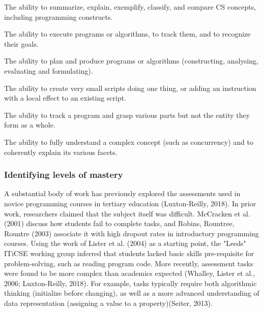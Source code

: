 \begin{description}[leftmargin=1em]
\item[Understanding:] The ability to summarize, explain, exemplify,
    classify, and compare CS concepts, including programming constructs.
\item[Applying:] The ability to execute programs or algorithms, to track
    them, and to recognize their goals.
\item[Creating:] The ability to plan and produce programs or algorithms
    (constructing, analysing, evaluating and formulating).
\item[Unistructural:] The ability to create very small scripts doing one
    thing, or adding an instruction with a local effect to an existing
    script.
\item[Multistructural:] The ability to track a program and grasp various
    parts but not the entity they form as a whole.
\item[Relational:] The ability to fully understand a complex concept (such
    as concurrency) and to coherently explain its various facets.
\end{description}






\subsubsection*{Identifying levels of mastery}
A substantial body of work has previously explored the assessments used in novice programming courses in tertiary education (Luxton-Reilly, 2018). In prior work, researchers claimed that the subject itself was difficult. McCracken et al. (2001) discuss how students fail to complete tasks, and Robins, Rountree, Rountre (2003) associate it with high dropout rates in introductory programming courses. Using the work of Lister et al. (2004) as a starting point, the "Leeds" ITiCSE working group inferred that students lacked basic skills pre-requisite for problem-solving, such as reading program code. More recently, assessment tasks were found to be more complex than academics expected (Whalley, Lister et al., 2006; Luxton-Reilly, 2018). For example, tasks typically require both algorithmic thinking (initialize before changing), as well as a more advanced understanding of data representation (assigning a value to a property)(Seiter, 2013).

